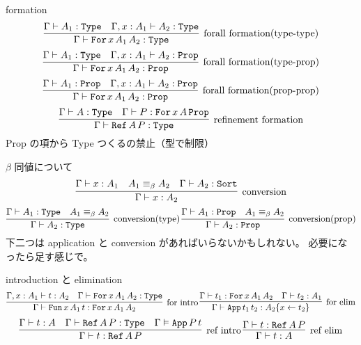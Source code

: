 \begin{itembox}[l]{formation}
  \[\infer[\text{forall formation(type-type)}]{\Gamma \vdash \texttt{For} \, x \, A_1 \, A_2 : \texttt{Type}}{\Gamma \vdash A_1 : \texttt{Type} & \Gamma , x : A_1 \vdash A_2 : \texttt{Type} }\]
  \[\infer[\text{forall formation(type-prop)}]{\Gamma \vdash \texttt{For} \, x \, A_1 \, A_2 : \texttt{Prop}}{\Gamma \vdash A_1 : \texttt{Type} & \Gamma , x : A_1 \vdash A_2 : \texttt{Prop} }\]
  \[\infer[\text{forall formation(prop-prop)}]{\Gamma \vdash \texttt{For} \, x \, A_1 \, A_2 : \texttt{Prop}}{\Gamma \vdash A_1 : \texttt{Prop} & \Gamma , x : A_1 \vdash A_2 : \texttt{Prop} }\]
  \[\infer[\text{refinement formation}]{\Gamma \vdash \texttt{Ref} \, A \, P : \texttt{Type}}{\Gamma \vdash A : \texttt{Type} & \Gamma \vdash P : \texttt{For} \, x \, A \, \texttt{Prop}}\]
  Prop の項から Type つくるの禁止（型で制限）
\end{itembox}

\begin{itembox}[l]{\(\beta\) 同値について}
  \[\infer[\text{conversion}]{\Gamma \vdash x : A_2}{\Gamma \vdash x : A_1 & A_1 \equiv_{\beta} A_2 & \Gamma \vdash A_2 : \texttt{Sort}} \]
  \[\infer[\text{conversion(type)}]{\Gamma \vdash A_2 : \texttt{Type}}{\Gamma \vdash A_1 : \texttt{Type} & A_1 \equiv_{\beta} A_2} \,
  \infer[\text{conversion(prop)}]{\Gamma \vdash A_2 : \texttt{Prop}}{\Gamma \vdash A_1 : \texttt{Prop} & A_1 \equiv_{\beta} A_2}\]
  下二つは application と conversion があればいらないかもしれない。
  必要になったら足す感じで。
\end{itembox}

\begin{itembox}[l]{introduction と elimination}
  \[
    \infer[\text{for intro}]{\Gamma \vdash \texttt{Fun} \, x \, A_1 \, t : \texttt{For} \, x \, A_1 \, A_2}{\Gamma , x : A_1 \vdash t : A_2 & \Gamma \vdash \texttt{For} \, x \, A_1 \, A_2 : \texttt{Type}} \,
    \infer[\text{for elim}]{\Gamma \vdash \texttt{App} \, t_1 \, t_2 : A_2\{x \leftarrow t_2\}}{\Gamma \vdash t_1 : \texttt{For} \, x \, A_1 \, A_2 & \Gamma \vdash t_2 : A_1} \]
  \[
    \infer[\text{ref intro}]{\Gamma \vdash t : \texttt{Ref} \, A \, P}{\Gamma \vdash t : A & \Gamma \vdash \texttt{Ref} \, A \, P : \texttt{Type} & \Gamma \vDash \texttt{App} \, P \, t} \,
    \infer[\text{ref elim}]{\Gamma \vdash t : A}{\Gamma \vdash t : \texttt{Ref} \, A \, P} \]
\end{itembox}

